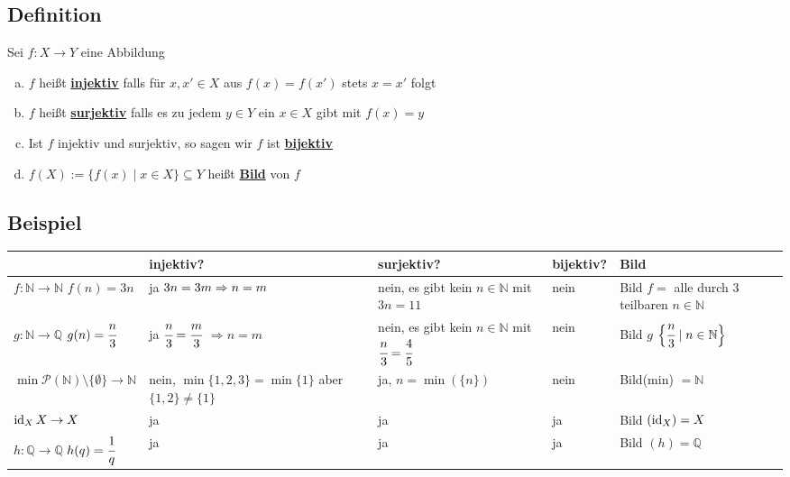 \subsection{Definition}
Sei \(f : X \rightarrow Y\) eine Abbildung
\begin{enumerate}[a)]
\item \(f\) heißt \underline{\textbf{injektiv}} falls für \(x,x' \in X \) aus \( f(x)=f(x') \) stets \( x=x'\) folgt
\item \(f\) heißt \underline{\textbf{surjektiv}} falls es zu jedem \(y \in Y \) ein \(x \in X\) gibt mit \(f(x)=y\)
\item Ist \(f\) injektiv und surjektiv, so sagen wir \(f\) ist \underline{\textbf{bijektiv}}
\item \(f(X) := \big\{ f(x) \mid x \in X \big\} \subseteq Y \) heißt \underline{\textbf{Bild}} von \(f\)
\end{enumerate}

\subsection{Beispiel}
\begin{tabular}{| p{2.3cm} | p{4cm} | p{3.2cm} | p{1.5cm} | p{3.2cm} |} \hline
 & injektiv? & surjektiv? & bijektiv? & Bild \\
\hline \(f : \mathds{N} \rightarrow \mathds{N} \)  \( f(n)=3n\) & ja \(3n=3m \newline \Rightarrow n=m\) & nein, es gibt kein \(n \in \mathds{N}\) mit \newline \(3n=11\) & nein & Bild \(f=\) \newline alle durch 3 teilbaren \(n \in \mathds{N}\) \\
\hline \( g : \mathds{N} \rightarrow \mathds{Q} \) \newline \( g(n)= \cfrac{n}{3} \) & ja \(\cfrac{n}{3} = \cfrac{m}{3}\) \newline \( \Rightarrow n=m\) & nein, es gibt kein \(n \in \mathds{N}\) mit \( \cfrac{n}{3} = \cfrac{4}{5}\) & nein & Bild \(g\) \newline \( \Big\{\cfrac{n}{3} \mid n  \in \mathds{N}\Big\} \) \\
\hline \( \min \mathcal{P}(\mathds{N}) \setminus \{ \emptyset \} \rightarrow \mathds{N}\)
& nein, \newline \( \min \{1,2,3\} = \min \{1\} \) \newline aber \( \{1,2\} \not= \{1\}\) 
& ja, \(n= \min(\{n\}) \)
& nein & Bild(min) \( = \mathds{N}\) \\
\hline \( \id_X  X \rightarrow X\) & ja & ja & ja & Bild \( (\id_X)=X\) \\
\hline \(h: \mathds{Q} \rightarrow \mathds{Q}\) \newline \(h(q)= \cfrac{1}{q}\)
& ja & ja & ja & Bild \((h) = \mathds{Q}\) \\
\hline
\end{tabular}

